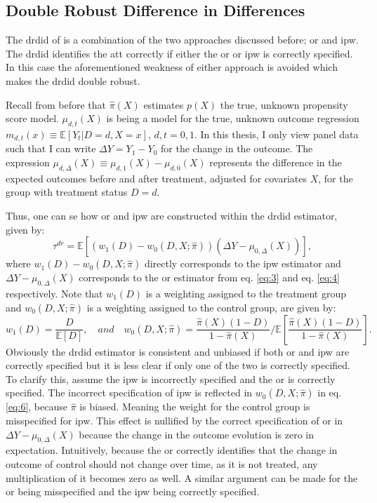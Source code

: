\subsection{Double Robust Difference in Differences}

The \ac{drdid} of \citet{santannaDoublyRobustDifferenceindifferences2020} is a combination of the two approaches discussed before; \ac{or} and \ac{ipw}.
The \ac{drdid} identifies the \ac{att} correctly if either the \ac{or} or \ac{ipw} is correctly specified.
In this case the aforementioned weakness of either approach is avoided which makes the \ac{drdid} double robust.

Recall from before that $\hat{\pi}(X)$ estimates $p(X)$ the true, unknown propensity score model. $\mu_{d,t}(X)$ is being a model for the true, unknown outcome regression $m_{d,t}(x)\equiv \mathbb{E}[Y_t | D = d, X = x]$, $d, t = 0, 1$.
In this thesis, I only view panel data such that I can write $\Delta Y = Y_1 - Y_0$ for the change in the outcome.
The expression $\mu_{d,\Delta}(X) \equiv \mu_{d,1}(X) - \mu_{d,0}(X)$ represents the difference in the expected outcomes before and after treatment, adjusted for covariates $X$, for the group with treatment status $D=d$.

Thus, one can se how \ac{or} and \ac{ipw} are constructed within the \ac{drdid} estimator, given by:
\begin{equation}
\tau^{dr} = \mathbb{E} \left[ \left( w_1(D) - w_0(D, X; \hat{\pi}) \right) \left( \Delta Y - \mu_{0, \Delta}(X) \right) \right],
\label{eq:5}
\end{equation}
where $w_1(D) - w_0(D, X; \hat{\pi})$ directly corresponds to the \ac{ipw} estimator and $\Delta Y - \mu_{0, \Delta}(X)$ corresponds to the \ac{or} estimator from eq. \ref{eq:3} and eq. \ref{eq:4} respectively.
Note that $w_1(D)$ is a weighting assigned to the treatment group and $w_0(D, X; \hat{\pi})$ is a weighting assigned to the control group, are given by:
\begin{equation}
w_1(D) = \frac{D}{\mathbb{E}[D]}, \quad  \mathit{and} \quad
w_0(D, X; \hat{\pi}) = \frac{\hat{\pi}(X)(1-D)}{1 - \hat{\pi}(X)} \Bigg/ \mathbb{E} \left[ \frac{\hat{\pi}(X)(1-D)}{1 - \hat{\pi}(X)} \right].
\label{eq:6}
\end{equation}
Obviously the \ac{drdid} estimator is consistent and unbiased if both \ac{or} and \ac{ipw} are correctly specified but it is less clear if only one of the two is correctly specified.
To clarify this, assume the \ac{ipw} is incorrectly specified and the \ac{or} is correctly specified.
The incorrect specification of \ac{ipw} is reflected in $w_0(D, X; \hat{\pi})$ in eq. \ref{eq:6}, because $\hat{\pi}$ is biased.
Meaning the weight for the control group is misspecified for \ac{ipw}.
This effect is nullified by the correct specification of \ac{or} in $\Delta Y - \mu_{0, \Delta}(X)$ because the change in the outcome evolution is zero in expectation.
Intuitively, because the \ac{or} correctly identifies that the change in outcome of control should not change over time, as it is not treated, any multiplication of it becomes zero as well.
A similar argument can be made for the \ac{or} being misspecified and the \ac{ipw} being correctly specified.
